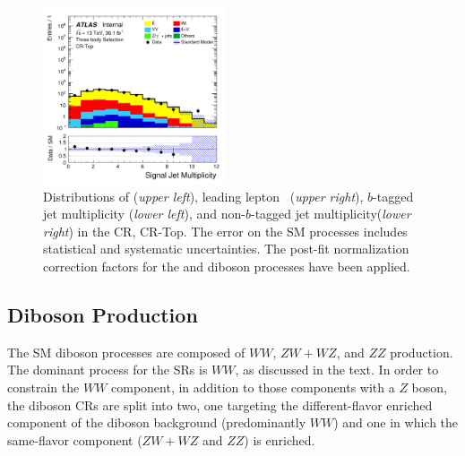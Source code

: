 \begin{figure}[!htb]
\begin{center}
        \includegraphics[width=0.48\textwidth]{figures/search_stop2l/bkg_est/crtop/crt_nSJets}
        \caption{
            Distributions of \rpt (\textit{upper left}), leading lepton \gaminv~(\textit{upper right}),
            $b$-tagged jet multiplicity (\textit{lower left}), and non-$b$-tagged jet multiplicity(\textit{lower right}) in the \ttbar CR,
            CR-Top.
            The error on the SM processes includes statistical and systematic uncertainties.
            The post-fit normalization correction factors for the \ttbar and diboson processes
            have been applied.
        }
        \label{fig:crt_1}
    \end{center}
\end{figure}



%
%

\subsection{Diboson Production}
\label{sec:stop_vv_estimate}

The SM diboson processes are composed of $WW$, $ZW+WZ$, and $ZZ$ production.
The dominant process for the \bWN SRs is $WW$, as discussed in the text.
In order to constrain the $WW$ component, in addition to those components with a $Z$ boson,
the diboson CRs are split into two, one targeting the different-flavor enriched component
of the diboson background (predominantly $WW$) and one in which the same-flavor component ($ZW+WZ$ and $ZZ$)
is enriched.

